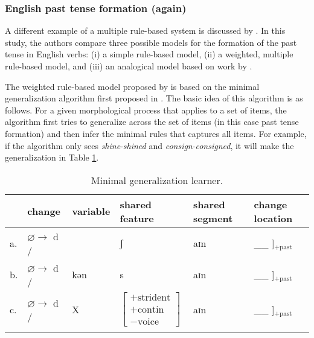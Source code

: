 \subsubsection{English past tense formation (again)}


A different example of a multiple rule-based system is discussed by \textcite{Albright.2003}. In this study, the authors compare three possible models for the formation of the past tense in English verbs: (i) a simple rule-based model, (ii) a weighted, multiple rule-based model, and (iii) an analogical model based on work by \textcite{Nosofsky.1990}.

The weighted rule-based model proposed by \textcite{Albright.2003} is based on the minimal generalization algorithm first proposed in \textcite{Albright.1999}. The basic idea of this algorithm is as follows. For a given morphological process that applies to a set of items, the algorithm first tries to generalize across the set of items (in this case past tense formation) and then infer the minimal rules that captures all items. For example, if the algorithm only sees \textit{shine}-\textit{shined} and \textit{consign}-\textit{consigned}, it will make the generalization in Table \ref{tab:minima-gen-al}.

\newpage

\begin{table}
    \small
    \caption{Minimal generalization learner.} \label{tab:minima-gen-al}
    \begin{tabular}[t]{llllll}
      \lsptoprule
      & change & variable & shared feature & shared segment & change location \\
      \midrule
      a. & $\varnothing{}\rightarrow$ d / & & ʃ & aɪn & \_\_ ]$_{+\text{past}}$ \\
      b. & $\varnothing{}\rightarrow$ d / & kən & s & aɪn & \_\_ ]$_{+\text{past}}$ \\
      c. & $\varnothing{}\rightarrow$ d / & X & $\left[\begin{array}{c}
                                               +\text{strident}\\
                                               +\text{contin}\\
                                               -\text{voice}
                                             \end{array}\right]$ & aɪn & \_\_ ]$_{+\text{past}}$ \\
      \lspbottomrule
    \end{tabular}
\end{table}

